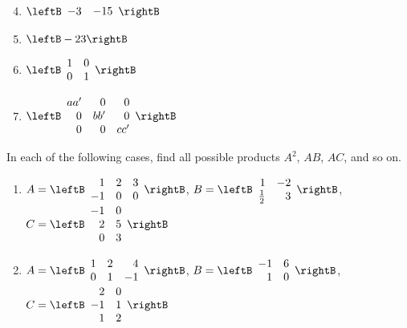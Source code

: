 \begin{multicols}{2}
\begin{ex}
\begin{sol}
\begin{enumerate}[label={\alph*.}]
\setcounter{enumi}{3}
\item  
$\leftB \begin{array}{rr}
-3 & -15
\end{array} \rightB$

\setcounter{enumi}{5}
\item 
$\leftB -23 \rightB$

\setcounter{enumi}{7}
\item 
$\leftB \begin{array}{rr}
1 & 0 \\
0 & 1
\end{array} \rightB
$

\setcounter{enumi}{9}
\item  
$\leftB \begin{array}{rrr}
aa^\prime & 0 & 0 \\
0 & bb^\prime & 0 \\
0 & 0 & cc^\prime
\end{array} \rightB
$

\end{enumerate}
\end{sol}
\end{ex}

\begin{ex}
In each of the following cases, find all possible products $A^{2}$, $AB$, $AC$, and so on.


\begin{enumerate}[label={\alph*.}]
\item
$A = \leftB \begin{array}{rrr}
1 & 2 & 3 \\
-1 & 0 & 0
\end{array} \rightB$, 
$B = \leftB \begin{array}{rr}
1 & -2 \\
\frac{1}{2} & 3
\end{array} \rightB$, \\
 $C = \leftB \begin{array}{rr}
-1 & 0 \\
2 & 5 \\
0 & 3
\end{array} \rightB
$ 

\item
$A = \leftB \begin{array}{rrr}
	1 & 2 & 4 \\
	0 & 1 & -1
\end{array} \rightB$, 
$B = \leftB \begin{array}{rr}
	-1 & 6 \\
	1 & 0
\end{array} \rightB$, \\
$C = \leftB \begin{array}{rr}
	2 & 0 \\
	-1 & 1 \\
	1 & 2
\end{array} \rightB
$


\end{enumerate}
\end{ex}
\end{multicols}
